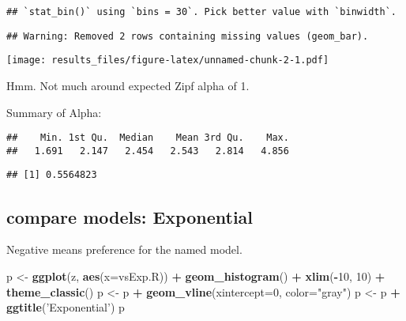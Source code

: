 \documentclass[]{article}
\newenvironment{Shaded}{\begin{snugshade}}{\end{snugshade}}
\newcommand{\DataTypeTok}[1]{\textcolor[rgb]{0.13,0.29,0.53}{#1}}
\newcommand{\DecValTok}[1]{\textcolor[rgb]{0.00,0.00,0.81}{#1}}
\newcommand{\KeywordTok}[1]{\textcolor[rgb]{0.13,0.29,0.53}{\textbf{#1}}}
\newcommand{\NormalTok}[1]{#1}
\newcommand{\OperatorTok}[1]{\textcolor[rgb]{0.81,0.36,0.00}{\textbf{#1}}}
\newcommand{\StringTok}[1]{\textcolor[rgb]{0.31,0.60,0.02}{#1}}
\begin{document}
\begin{verbatim}
## `stat_bin()` using `bins = 30`. Pick better value with `binwidth`.
\end{verbatim}

\begin{verbatim}
## Warning: Removed 2 rows containing missing values (geom_bar).
\end{verbatim}

\texttt{[image: results\_files/figure-latex/unnamed-chunk-2-1.pdf]}

Hmm. Not much around expected Zipf alpha of 1.

Summary of Alpha:

\begin{Shaded}
\end{Shaded}

\begin{verbatim}
##    Min. 1st Qu.  Median    Mean 3rd Qu.    Max. 
##   1.691   2.147   2.454   2.543   2.814   4.856
\end{verbatim}

\begin{Shaded}
\end{Shaded}

\begin{verbatim}
## [1] 0.5564823
\end{verbatim}

\hypertarget{compare-models-exponential}{%
\subsection{compare models:
Exponential}\label{compare-models-exponential}}

Negative means preference for the named model.

\begin{Shaded}
\begin{Highlighting}[]
\NormalTok{p <-}\StringTok{ }\KeywordTok{ggplot}\NormalTok{(z, }\KeywordTok{aes}\NormalTok{(}\DataTypeTok{x=}\NormalTok{vsExp.R)) }\OperatorTok{+}\StringTok{ }\KeywordTok{geom_histogram}\NormalTok{() }\OperatorTok{+}\StringTok{ }\KeywordTok{xlim}\NormalTok{(}\OperatorTok{-}\DecValTok{10}\NormalTok{, }\DecValTok{10}\NormalTok{) }\OperatorTok{+}\StringTok{ }\KeywordTok{theme_classic}\NormalTok{()}
\NormalTok{p <-}\StringTok{ }\NormalTok{p }\OperatorTok{+}\StringTok{ }\KeywordTok{geom_vline}\NormalTok{(}\DataTypeTok{xintercept=}\DecValTok{0}\NormalTok{, }\DataTypeTok{color=}\StringTok{"gray"}\NormalTok{)}
\NormalTok{p <-}\StringTok{ }\NormalTok{p }\OperatorTok{+}\StringTok{ }\KeywordTok{ggtitle}\NormalTok{(}\StringTok{'Exponential'}\NormalTok{)}
\NormalTok{p}
\end{Highlighting}
\end{Shaded}
\end{document}
